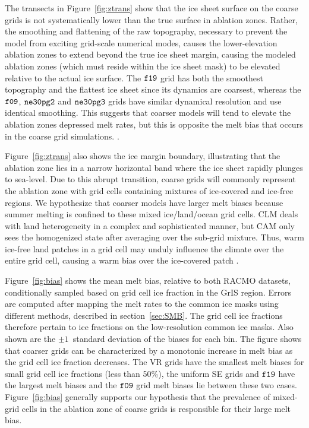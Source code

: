 \documentclass[draft]{agujournal2019}
\begin{document}
The transects in Figure~\ref{fig:ztrans} show that the ice sheet surface on the coarse grids is not systematically lower than the true surface in ablation zones. Rather, the smoothing and flattening of the raw topography, necessary to prevent the model from exciting grid-scale numerical modes, causes the lower-elevation ablation zones to extend beyond the true ice sheet margin, causing the modeled ablation zones (which must reside within the ice sheet mask) to be elevated relative to the actual ice surface. The $\tt f19$ grid has both the smoothest topography and the flattest ice sheet since its dynamics are coarsest, whereas the $\tt f09$, $\tt ne30pg2$ and $\tt ne30pg3$ grids have similar dynamical resolution and use identical smoothing. This suggests that coarser models will tend to elevate the ablation zones {\color{blue}{relative to where they should be, which may be expected to cause anomalous (adiabatic) cooling and}} depressed melt rates, but this is opposite the melt bias that occurs in the coarse grid simulations. {\color{blue}{Also, the EC downscaling should be able to correct for situations where model ice surface is elevated relative to the true ice surface, although for very large elevation differences/errors the EC scheme may not be adequate}}.

Figure~\ref{fig:ztrans} also shows the ice margin boundary, illustrating that the ablation zone lies in a narrow horizontal band where the ice sheet rapidly plunges to sea-level. Due to this abrupt transition, coarse grids will commonly represent the ablation zone with grid cells containing mixtures of ice-covered and ice-free regions. We hypothesize that coarser models have larger melt biases because summer melting is confined to these mixed ice/land/ocean grid cells. CLM deals with land heterogeneity in a complex and sophisticated manner, but CAM only sees the homogenized state after {\color{blue}{area}} averaging over the sub-grid mixture. Thus, warm ice-free land patches in a grid cell may unduly influence the climate over the entire grid cell, causing a warm bias over the ice-covered patch {\color{blue}{and more melting}}.

Figure~\ref{fig:bias} shows the mean melt bias, relative to both RACMO datasets, conditionally sampled based on grid cell ice fraction in the GrIS region. Errors are computed after mapping the melt rates to the common ice masks using different methods, described in section~\ref{sec:SMB}. The grid cell ice fractions therefore pertain to ice fractions on the low-resolution common ice masks. Also shown are the $\pm 1$~standard deviation of the biases for each bin. The figure shows that coarser grids can be characterized by a monotonic increase in melt bias as the grid cell ice fraction decreases. The VR grids have the smallest melt biases for small grid cell ice fractions (less than 50\%), the {\color{blue}{quasi-}}uniform SE grids and $\tt f19$ have the largest melt biases and the $\tt f09$ grid melt biases lie between these two cases. Figure~\ref{fig:bias} generally supports our hypothesis that the prevalence of mixed-grid cells in the ablation zone of coarse grids is responsible for their large melt bias.
\end{document}

